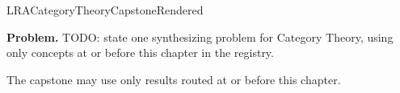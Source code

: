 \ifcsname LRACategoryTheoryCapstoneRendered\endcsname
\else
\expandafter\gdef\csname LRACategoryTheoryCapstoneRendered\endcsname{}

\newpage
{}
\label{cap:category-theory}

\begin{tcolorbox}[
  colback=gray!6,
  colframe=gray!40,
  arc=2pt,
  left=8pt, right=8pt, top=6pt, bottom=6pt,
  title={\small\textbf{Capstone Problem}},
  fonttitle=\small\bfseries
]
\textbf{Problem.}
TODO: state one synthesizing problem for Category Theory, using only concepts at or
before this chapter in the registry.
\end{tcolorbox}

\begin{remark*}
The capstone may use only results routed at or before this chapter.
\end{remark*}

\clearpage
\fi
